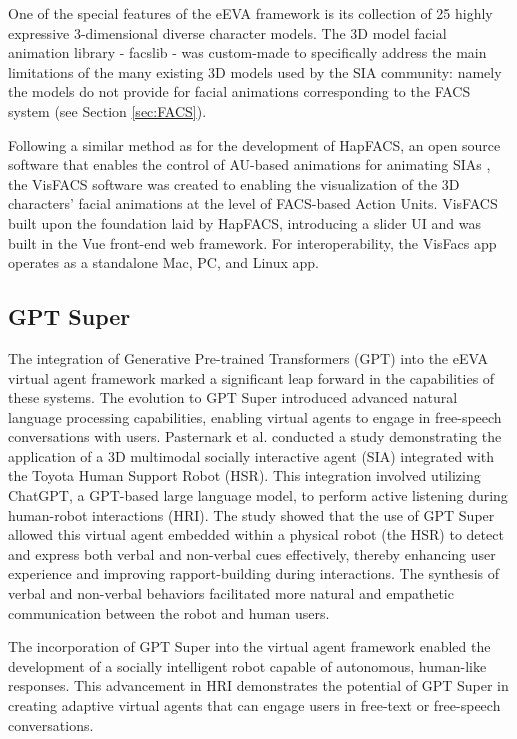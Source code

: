 \documentclass[12pt]{article}
\begin{document}
One of the special features of the eEVA framework is its collection of 25 highly expressive 3-dimensional diverse character models.  The 3D model facial animation library - facslib - was custom-made to specifically address the  main limitations of the many existing 3D models used by the SIA community: namely the models do not provide for facial animations corresponding to the FACS system (see Section \ref{sec:FACS}).

Following a similar method as for the development of HapFACS, an open source  software that enables the control of AU-based animations for animating SIAs \cite{Amini2015}, the VisFACS software was created to enabling the visualization of the 3D characters' facial animations at the level of FACS-based Action Units. 
VisFACS built upon the foundation laid by HapFACS, introducing a slider UI and was built in the Vue front-end web framework. For interoperability, the VisFacs app operates as a standalone Mac, PC, and Linux app.

\subsection{GPT Super}

The integration of Generative Pre-trained Transformers (GPT) into the eEVA virtual agent framework marked a significant leap forward in the capabilities of these systems. The evolution to GPT Super introduced advanced natural language processing capabilities, enabling virtual agents to engage in free-speech conversations with users.  Pasternark et al. \cite{Pasternak20243DListening} conducted a study demonstrating the application of a 3D multimodal socially interactive agent (SIA) integrated with the Toyota Human Support Robot (HSR). This integration involved utilizing ChatGPT, a GPT-based large language model, to perform active listening during human-robot interactions (HRI). The study showed that the use of GPT Super allowed this virtual agent embedded within a physical robot (the HSR) to detect and express both verbal and non-verbal cues effectively, thereby enhancing user experience and improving rapport-building during interactions. The synthesis of verbal and non-verbal behaviors facilitated more natural and empathetic communication between the robot and human users.

The incorporation of GPT Super into the virtual agent framework enabled the development of a socially intelligent robot capable of autonomous, human-like responses. This advancement in HRI demonstrates the potential of GPT Super in creating adaptive virtual agents that can engage users in free-text or free-speech conversations.  
\end{document}
